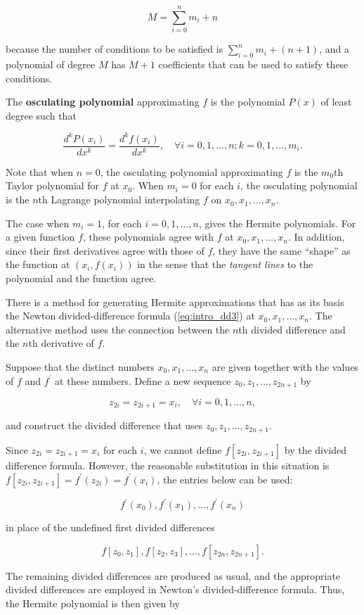 \documentclass[preprint,12pt]{elsarticle}
\begin{document}
$$M=\sum_{i=0}^{n}{m_{i}}+n$$

because the number of conditions to be satisfied is $\sum_{i=0}^{n}{m_i}+(n+1)$, and a polynomial of degree $M$ has $M+1$ coefficients that can be used to satisfy these conditions.

The \textbf{osculating polynomial} approximating $f$ is the polynomial $P(x)$ of least degree such that 

$$\frac{d^{k}P(x_i)}{dx^{k}}=\frac{d^{k}f(x_i)}{dx^{k}},\quad\forall i=0,1,\dots,n;k=0,1,\dots,m_{i}.$$

Note that when $n = 0$, the osculating polynomial approximating $f$ is the $m_0$th Taylor polynomial for $f$ at $x_0$. When $m_i =0$ for each $i$, the osculating polynomial is the $n$th Lagrange polynomial interpolating $f$ on $x_0,x_1,\dots,x_n$.

The case when $m_i =1$, for each $i=0,1,\dots,n$, gives the Hermite polynomials. For a given function $f$, these polynomials agree with $f$ at $x_0,x_1,\dots,x_n$. In addition, since their first derivatives agree with those of $f$, they have the same “shape” as the function at $(x_i,f(x_i))$ in the sense that the \textit{tangent lines} to the polynomial and the function agree.

There is a method for generating Hermite approximations that has as its basis the Newton divided-difference formula (\ref{eq:intro_dd3}) at $x_0,x_1,\dots,x_n$. The alternative method uses the connection between the $n$th divided difference and the $n$th derivative of $f$.

Suppose that the distinct numbers $x_0,x_1,\dots,x_n$ are given together with the values of $f$ and $f^{'}$ at these numbers. Define a new sequence $z_0,z_1,\dots,z_{2n+1}$ by 

$$
z_{2i}=z_{2i+1}=x_i,\quad\forall i=0,1,\dots,n,
$$

and construct the divided difference that uses $z_0,z_1,\dots,z_{2n+1}$. 

Since $z_{2i}=z_{2i+1}=x_i$ for each $i$, we cannot define $f[z_{2i},z_{2i+1}]$ by the divided difference formula. However, the reasonable substitution in this situation is $f[z_{2i},z_{2i+1}]=f^{'}(z_{2i})=f^{'}(x_i)$, the entries below can be used:

$$f^{'}(x_0),f^{'}(x_1),\dots,f^{'}(x_n)$$

in place of the undefined first divided differences

$$f[z_0,z_1],f[z_2,z_3],\dots,f[z_{2n},z_{2n+1}].$$

The remaining divided differences are produced as usual, and the appropriate divided differences are employed in Newton’s divided-difference formula. Thus, the Hermite polynomial is then given by
\end{document}
